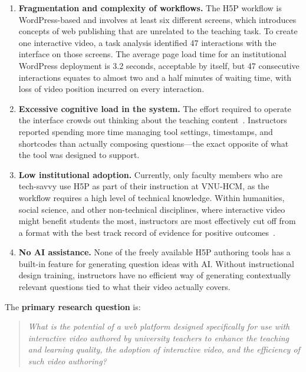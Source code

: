 \begin{enumerate}
  \item \textbf{Fragmentation and complexity of workflows.} The H5P workflow is WordPress-based and involves at least six different screens, which introduces concepts of web publishing that are unrelated to the teaching task. To create one interactive video, a task analysis identified 47 interactions with the interface on those screens. The average page load time for an institutional WordPress deployment is 3.2 seconds, acceptable by itself, but 47 consecutive interactions equates to almost two and a half minutes of waiting time, with loss of video position  incurred on every interaction.

  \item \textbf{Excessive cognitive load in the system.} The effort required to operate the interface crowds out thinking about the teaching content~\cite{chandler1991,mayer2009}. Instructors reported spending more time managing tool settings, timestamps, and shortcodes than actually composing questions—the exact opposite of what the tool was designed to support.

  \item \textbf{Low institutional adoption.} Currently, only faculty members who are tech-savvy use H5P as part of their instruction at VNU-HCM, as the workflow requires a high level of technical knowledge. Within humanities, social science, and other non-technical disciplines, where interactive video might benefit students the most, instructors are most effectively cut off from a format with the best track record of evidence for positive outcomes~\cite{davis1989,hadullo2017}.

  \item \textbf{No AI assistance.} None of the freely available H5P authoring tools has a built-in feature for generating question ideas with AI. Without instructional design training, instructors have no efficient way of generating contextually relevant questions tied to what their video actually covers.
\end{enumerate}

The \textbf{primary research question} is:

\begin{quote}
  \itshape What is the potential of a web platform designed specifically for use with interactive
  video authored by university teachers to enhance the teaching and learning quality, the
  adoption of interactive video, and the efficiency of such video authoring?
\end{quote}

